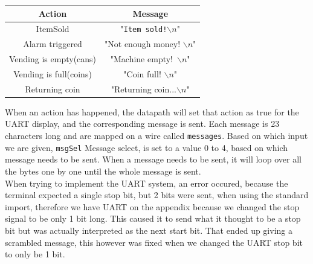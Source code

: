 \begin{center}
\begin{tabular}{|c|c|}
    \hline
    \textbf{Action} & \textbf{Message} \\
    \hline
    ItemSold & "\texttt{Item sold!\quad\quad\quad\quad\quad            }$\backslash n$"\\
    \hline
    Alarm triggered & "Not enough money!\;\;\;\;\:\:     $\backslash n$"\\
    \hline
    Vending is empty(cans) & "Machine empty!\quad\quad\quad\,        $\backslash n$"\\
    \hline
    Vending is full(coins) & "Coin full!\quad\quad\quad\quad\quad\quad\; $\backslash n$"\\
    \hline
    Returning coin & "Returning coin...\quad\quad \;\;\;\;\;$\backslash n$"\\
    \hline
\end{tabular}
\end{center}
When an action has happened, the datapath will set that action as true for the UART display, and the corresponding message is sent. Each message is 23 characters long and are mapped on a wire called \texttt{messages}. Based on which input we are given, \texttt{msgSel} Message select, is set to a value 0 to 4, based on which message needs to be sent. When a message needs to be sent, it will loop over all the bytes one by one until the whole message is sent.\\
When trying to implement the UART system, an error occured, because the terminal expected a single stop bit, but 2 bits were sent, when using the standard import, therefore we have UART on the appendix because we changed the stop signal to be only 1 bit long. This caused it to send what it thought to be a stop bit but was actually interpreted as the next start bit. That ended up giving a scrambled message, this however was fixed when we changed the UART stop bit to only be 1 bit.\\

